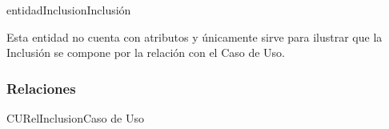 \begin{BusinessEntity}{entidadInclusion}{Inclusión}
		
	\item Esta entidad no cuenta con atributos y únicamente sirve para ilustrar que la Inclusión se compone por la relación con el Caso de Uso.
\end{BusinessEntity}

\subsubsection{Relaciones}

\begin{BusinessFact}{CURelInclusion}{Caso de Uso}
\end{BusinessFact}